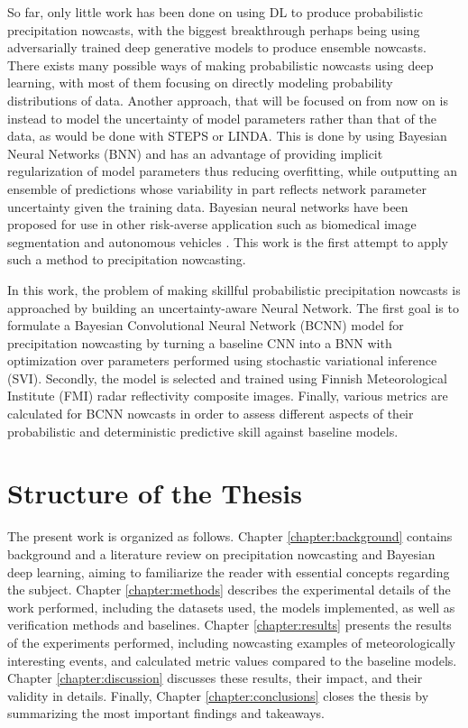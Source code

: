 So far, only little work has been done on using DL to produce probabilistic precipitation nowcasts, with the biggest breakthrough perhaps being \citet{ravuri_skilful_2021} using adversarially trained deep generative models to produce ensemble nowcasts. There exists many possible ways of making probabilistic nowcasts using deep learning, with most of them focusing on directly modeling probability distributions of data. Another approach, that will be focused on from now on is instead to model the uncertainty of model parameters rather than that of the data, as would be done with STEPS or LINDA. This is done by using Bayesian Neural Networks (BNN) and has an advantage of providing implicit regularization of model parameters thus reducing overfitting, while outputting an ensemble of predictions whose variability in part reflects network parameter uncertainty given the training data. Bayesian neural networks have been proposed for use in other risk-averse application such as biomedical image segmentation \cite{kwon_uncertainty_2020} and autonomous vehicles \cite{mcallister_concrete_2017}. This work is the first attempt to apply such a method to precipitation nowcasting.


In this work, the problem of making skillful probabilistic precipitation nowcasts is approached by building an uncertainty-aware Neural Network. The first goal is to formulate a Bayesian Convolutional Neural Network (BCNN) model for precipitation nowcasting by turning a baseline CNN into a BNN with optimization over parameters performed using stochastic variational inference (SVI). Secondly, the model is selected and trained using Finnish Meteorological Institute (FMI) radar reflectivity composite images. Finally, various metrics are calculated for BCNN nowcasts in order to assess different aspects of their probabilistic and deterministic predictive skill against baseline models.


\section{Structure of the Thesis}

The present work is organized as follows. Chapter \ref{chapter:background} contains background and a literature review on precipitation nowcasting and Bayesian deep learning, aiming to familiarize the reader with essential concepts regarding the subject. Chapter \ref{chapter:methods} describes the experimental details of the work performed, including the datasets used, the models implemented, as well as verification methods and baselines. 
Chapter \ref{chapter:results} presents the results of the experiments performed, including nowcasting examples of meteorologically interesting events, and calculated metric values compared to the baseline models. Chapter \ref{chapter:discussion} discusses these results, their impact, and their validity in details. Finally, Chapter \ref{chapter:conclusions} closes the thesis by summarizing the most important findings and takeaways. 


